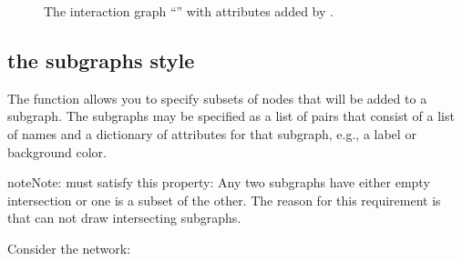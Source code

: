 \documentclass[letterpaper,10pt,english]{sphinxmanual}
\begin{document}
\begin{figure}[htbp]
\centering
\capstart

\noindent{}
\caption{The interaction graph “” with attributes added by {\hyperref[\detokenize{InteractionGraphs:add-style-sccs}]{}}.}\label{\detokenize{Manual:figure05}}\label{\detokenize{Manual:id10}}\end{figure}


\subsection{the subgraphs style}
\label{\detokenize{Manual:the-subgraphs-style}}
The function {\hyperref[\detokenize{InteractionGraphs:add-style-subgraphs}]{}} allows you to specify subsets of nodes that will be added to a  subgraph.
The subgraphs may be specified as a list of pairs that consist of a list of names and a dictionary
of  attributes for that subgraph, e.g., a label or background color.

\begin{sphinxadmonition}{note}{Note:}
 must satisfy this property:
Any two subgraphs have either empty intersection or one is a subset of the other.
The reason for this requirement is that  can not draw intersecting subgraphs.
\end{sphinxadmonition}

Consider the network:
\end{document}
